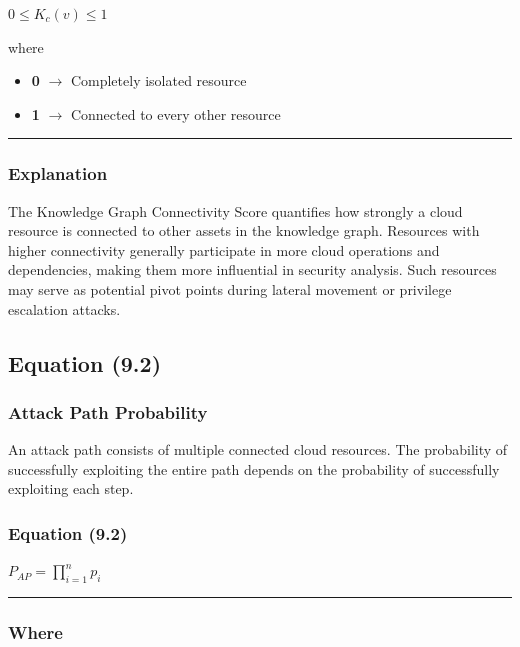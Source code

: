 $0 \leq K_c(v) \leq 1$

where

\begin{itemize}
\tightlist
\item
  \textbf{0} \(\rightarrow\) Completely isolated resource\\
\item
  \textbf{1} \(\rightarrow\) Connected to every other resource
\end{itemize}

\begin{center}\rule{0.5\linewidth}{0.5pt}\end{center}

\subsubsection{Explanation}

The Knowledge Graph Connectivity Score quantifies how strongly a cloud resource is connected to other assets in the knowledge graph. Resources with higher connectivity generally participate in more cloud operations and dependencies, making them more influential in security analysis. Such resources may serve as potential pivot points during lateral movement or privilege escalation attacks.

\subsection{Equation (9.2)}

\subsubsection{Attack Path Probability}

An attack path consists of multiple connected cloud resources. The probability of successfully exploiting the entire path depends on the probability of successfully exploiting each step.

\subsubsection{\texorpdfstring{\textbf{Equation (9.2)}}{Equation (9.2)}}

$P_{AP} = \prod_{i=1}^{n} p_i$

\begin{center}\rule{0.5\linewidth}{0.5pt}\end{center}

\subsubsection{Where}

